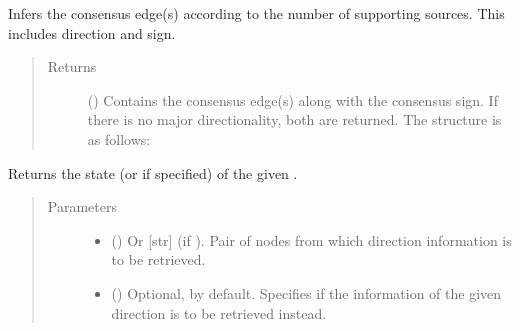 \documentclass[letterpaper,10pt,english]{sphinxmanual}
\begin{document}
\begin{fulllineitems}
\begin{fulllineitems}
\label{\detokenize{main:pypath.main.Direction.consensus_edges}}
Infers the consensus edge(s) according to the number of
supporting sources. This includes direction and sign.
\begin{quote}\begin{description}
\item[{Returns}] \leavevmode
() \textendash{} Contains the consensus edge(s) along with the
consensus sign. If there is no major directionality, both
are returned. The structure is as follows:

\end{description}\end{quote}

\end{fulllineitems}


\begin{fulllineitems}
\label{\detokenize{main:pypath.main.Direction.get_dir}}
Returns the state (or  if specified) of the given
.
\begin{quote}\begin{description}
\item[{Parameters}] \leavevmode\begin{itemize}
\item {} 
 () \textendash{} Or {[}str{]} (if ). Pair of nodes from which
direction information is to be retrieved.

\item {} 
 () \textendash{} Optional,  by default. Specifies if the
 information of the given direction is to
be retrieved instead.

\end{itemize}


\end{description}
\end{quote}
\end{fulllineitems}
\end{fulllineitems}
\end{document}
